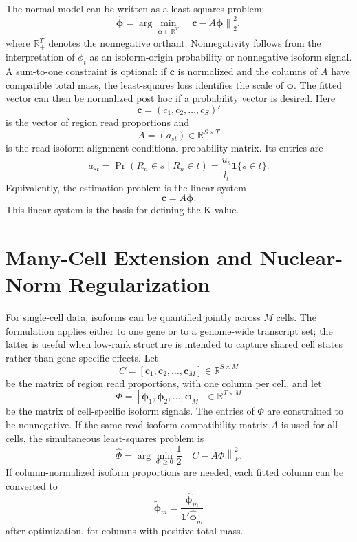 \documentclass[11pt]{article}
\begin{document}
The normal model can be written as a least-squares problem:
\[
  \hat{\boldsymbol{\phi}}
  =
  \arg\min_{\boldsymbol{\phi} \in \mathbb{R}_+^T}
  \left\|
    \mathbf{c} - A\boldsymbol{\phi}
  \right\|_2^2,
\]
where \(\mathbb{R}_+^T\) denotes the nonnegative orthant. Nonnegativity follows
from the interpretation of \(\phi_t\) as an isoform-origin probability or
nonnegative isoform signal. A sum-to-one constraint is optional: if
\(\mathbf{c}\) is normalized and the columns of \(A\) have compatible total
mass, the least-squares loss identifies the scale of
\(\boldsymbol{\phi}\). The fitted vector can then be normalized post hoc if a
probability vector is desired. Here
\[
  \mathbf{c} = (c_1,c_2,\ldots,c_S)'
\]
is the vector of region read proportions and
\[
  A = (a_{st}) \in \mathbb{R}^{S \times T}
\]
is the read-isoform alignment conditional probability matrix. Its entries are
\[
  a_{st}
  =
  \Pr(R_n \in s \mid R_n \in t)
  =
  \frac{\tilde{u}_s}{\tilde{l}_t}
  \mathbf{1}\{s \in t\}.
\]
Equivalently, the estimation problem is the linear system
\[
  \mathbf{c} = A\boldsymbol{\phi}.
\]
This linear system is the basis for defining the K-value.

\section*{Many-Cell Extension and Nuclear-Norm Regularization}

For single-cell data, isoforms can be quantified jointly across \(M\) cells.
The formulation applies either to one gene or to a genome-wide transcript set;
the latter is useful when low-rank structure is intended to capture shared cell
states rather than gene-specific effects. Let
\[
  C = [\mathbf{c}_1,\mathbf{c}_2,\ldots,\mathbf{c}_M]
  \in \mathbb{R}^{S \times M}
\]
be the matrix of region read proportions, with one column per cell, and let
\[
  \Phi = [\boldsymbol{\phi}_1,\boldsymbol{\phi}_2,\ldots,\boldsymbol{\phi}_M]
  \in \mathbb{R}^{T \times M}
\]
be the matrix of cell-specific isoform signals. The entries of \(\Phi\) are
constrained to be nonnegative. If the same read-isoform compatibility matrix
\(A\) is used for all cells, the simultaneous least-squares problem is
\[
  \hat{\Phi}
  =
  \arg\min_{\Phi \ge 0}
  \frac{1}{2}\left\|C - A\Phi\right\|_F^2.
\]
If column-normalized isoform proportions are needed, each fitted column can be
converted to
\[
  \tilde{\boldsymbol{\phi}}_m
  =
  \frac{\hat{\boldsymbol{\phi}}_m}
       {\mathbf{1}'\hat{\boldsymbol{\phi}}_m}
\]
after optimization, for columns with positive total mass.
\end{document}
